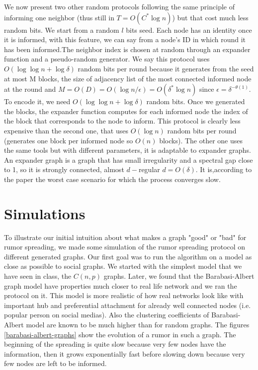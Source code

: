 \documentclass[10pt,journal,a4paper]{IEEEtran}
\begin{document}
We now present two other random protocols following the same principle of informing one neighbor (thus still in $T=O(C^*\log n)$) but that cost much less random bits. We start from a random $l$ bits seed. Each node has an identity once it is informed, with this feature, we can say from a node's ID in which round it has been informed.The neighbor index is chosen at random through an expander function and a pseudo-random generator. We say this protocol uses $O(\log\log n + \log \delta)$ random bits per round because it generates from the seed at most M blocks, the size of adjacency list of the most connected informed node at the round and $M=O(D)=O(\log n / \epsilon)=O(\delta^*\log n)$ since $\epsilon=\delta^{-\theta(1)}$. To encode it, we need $O(\log\log n + \log \delta)$ random bits. Once we generated the blocks, the expander function computes for each informed node the index of the block that corresponds to the node to inform. This protocol is clearly less expensive than the second one, that uses $O(\log n)$ random bits per round (generates one block per informed node so $O(n)$ blocks). The other one uses the same tools but with different parameters, it is adaptable to expander graphs. An expander graph is a graph that has small irregularity and a spectral gap close to 1, so it is strongly connected, almost $d-$regular $d=O(\delta)$. It is,according to the paper the worst case scenario for which the process converges slow.
 

\section{Simulations}

To illustrate our initial intuition about what makes a graph "good" or "bad" for rumor spreading, we made some simulation of the rumor spreading protocol on different generated graphs. Our first goal was to run the algorithm on a model as close as possible to social graphs. We started with the simplest model that we have seen in class, the $C(n,p)$ graphs. Later, we found that the Barabasi-Albert graph model \cite{abmodel} have properties much closer to real life network and we ran the protocol on it. This model is more realistic of how real networks look like with important hub and preferential attachment for already well connected nodes (i.e. popular person on social medias). Also the clustering coefficients of Barabasi-Albert model are known to be much higher than for random graphs. The figures \ref{barabasi-albert-graphs} show the evolution of a rumor in such a graph. The beginning of the spreading is quite slow because very few nodes have the information, then it grows exponentially fast before slowing down because very few nodes are left to be informed. 
\end{document}
